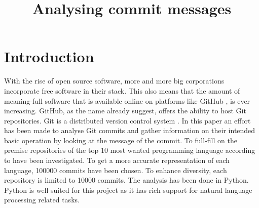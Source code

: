 \documentclass{article}
\title{Analysing commit messages}
\begin{document}
  \maketitle

  \section{Introduction}
  With the rise of open source software, more and more big corporations
  incorporate free software in their stack. This also means that the amount of
  meaning-full software that is available online on platforms like GitHub
  \cite{github}, is ever increasing. GitHub, as the name already suggest,
  offers the ability to host Git repositories. Git is a distributed version
  control system \cite{Git}. In this paper an effort has been made to analyse
  Git commits and gather information on their intended basic operation by
  looking at the message of the commit. To full-fill on the premise
  repositories of the top 10 most wanted programming language according to
  \cite{so-survey} have been investigated. To get a more accurate
  representation of each language, 100000 commits have been chosen. To enhance
  diversity, each repository is limited to 10000 commits. The analysis has been
  done in Python. Python is well suited for this project as it has rich support
  for natural language processing related tasks.
\end{document}
